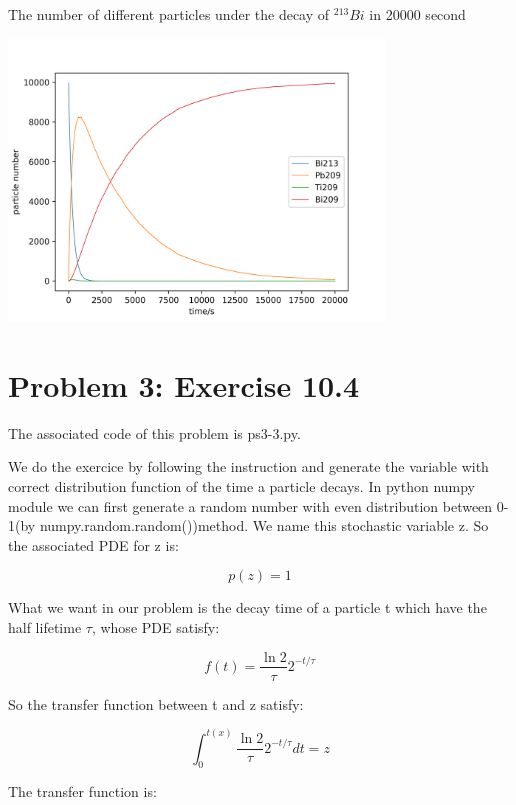\documentclass[letterpaper,12pt]{article}
\begin{document}
\begin{table}[!h]
    \centering
    \caption{The number of different particles under the decay of $^{213}Bi$ in 20000 second}
    \includegraphics[width=10cm]{ps3-2.png}
    \label{plot}%
\end{table}%


\section{Problem 3: Exercise 10.4}

The associated code of this problem is ps3-3.py.

We do the exercice by following the instruction and generate the variable with correct distribution function of the time a particle decays. In python numpy module we can first generate a random number with even distribution between 0-1(by numpy.random.random())method. We name this stochastic variable z. So the associated PDE for z is:

\begin{equation}
    p(z) = 1
\end{equation}

What we want in our problem is the decay time of a particle t which have the half lifetime $\tau$, whose PDE satisfy:

\begin{equation}
    f(t) = \frac{\ln{2}}{\tau} 2^{-t/\tau}
\end{equation}

So the transfer function between t and z satisfy:

\begin{equation}
    \int_0^{t(x)}  \frac{\ln{2}}{\tau} 2^{-t/\tau} dt = z
\end{equation}

The transfer function is:
\end{document}
